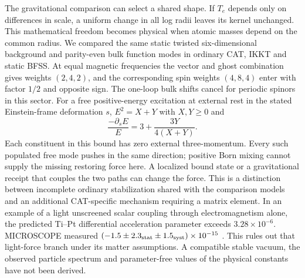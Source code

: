 The gravitational comparison can select a shared shape. If \(T_e\) depends only on differences in scale, a uniform change in all log radii leaves its kernel unchanged. This mathematical freedom becomes physical when atomic masses depend on the common radius. We compared the same static twisted six-dimensional background and parity-even bulk function modes in ordinary CAT, IKKT and static BFSS. At equal magnetic frequencies the vector and ghost combination gives weights \((2,4,2)\), and the corresponding spin weights \((4,8,4)\) enter with factor \(1/2\) and opposite sign. The one-loop bulk shifts cancel for periodic spinors in this sector. For a free positive-energy excitation at external rest in the stated Einstein-frame deformation \(s\), \(E^2=X+Y\) with \(X,Y\ge0\) and
\[
 \frac{-\partial_s E}{E}=3+\frac{3Y}{4(X+Y)} .
\]
Each constituent in this bound has zero external three-momentum. Every such populated free mode pushes in the same direction; positive Born mixing cannot supply the missing restoring force here. A localized bound state or a gravitational receipt that couples the two paths can change the force. This is a distinction between incomplete ordinary stabilization shared with the comparison models and an additional CAT-specific mechanism requiring a matrix element. In an example of a light unscreened scalar coupling through electromagnetism alone, the predicted Ti--Pt differential acceleration parameter exceeds \(3.28\times10^{-6}\). MICROSCOPE measured \((-1.5\pm2.3_{\rm stat}\pm1.5_{\rm syst})\times10^{-15}\) \cite{microscope}. This rules out that light-force branch under its matter assumptions. A compatible stable vacuum, the observed particle spectrum and parameter-free values of the physical constants have not been derived.


